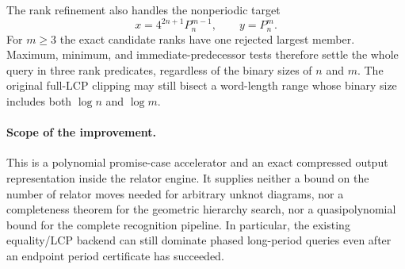 The rank refinement also handles the nonperiodic target
\[
 x=4^{2n+1}P_n^{m-1},\qquad y=P_n^m.
\]
For $m\geq3$ the exact candidate ranks have one rejected largest member.
Maximum, minimum, and immediate-predecessor tests therefore settle the whole
query in three rank predicates, regardless of the binary sizes of $n$ and
$m$.  The original full-LCP clipping may still bisect a word-length range
whose binary size includes both $\log n$ and $\log m$.

\paragraph{Scope of the improvement.}
This is a polynomial promise-case accelerator and an exact compressed
output representation inside the relator engine.  It supplies neither a
bound on the number of relator moves needed for arbitrary unknot diagrams,
nor a completeness theorem for the geometric hierarchy search, nor a
quasipolynomial bound for the complete recognition pipeline.  In particular,
the existing equality/LCP backend can still dominate phased long-period
queries even after an endpoint period certificate has succeeded.
